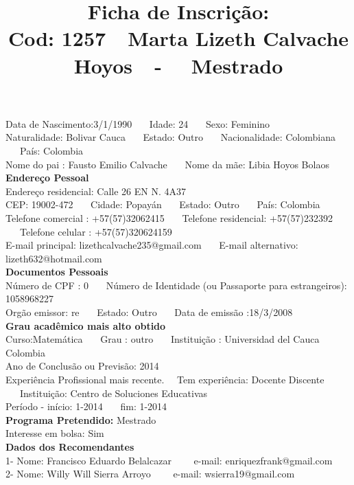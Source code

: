 \documentclass[11pt]{article}
\title{\vspace*{-4cm} Ficha de Inscrição: \\Cod: 1257\ \ Marta Lizeth Calvache Hoyos\ \ - \ \ Mestrado 
 }
\date{}
\begin{document}
\maketitle
\vspace*{-1.5cm}
\noindent Data de Nascimento:3/1/1990
\ \ \ Idade: 24   \ \ \ Sexo: Feminino
\\
Naturalidade: Bolivar Cauca  
\ \ \  Estado: Outro
\ \ \  Nacionalidade: Colombiana
\ \ \ País: Colombia
\\        
Nome do pai : Fausto Emilio Calvache 
\ \ \ Nome da mãe: Libia Hoyos Bolaos          
\\[0.2cm]                     
\textbf{Endereço Pessoal} 
\\ 
\noindent Endereço residencial: Calle 26 EN N. 4A37
\\
        CEP: 19002-472 
\ \ \ Cidade: Popayán 
\ \ \ Estado: Outro 
\ \ \ País: Colombia
\\		
		Telefone comercial : +57(57)32062415
\ \ \ Telefone residencial: +57(57)232392
\ \ \ Telefone celular : +57(57)320624159
\\
E-mail principal: lizethcalvache235@gmail.com
\ \ \ E-mail alternativo: lizeth632@hotmail.com 
\\[0.2cm] 
\textbf{Documentos Pessoais}
\\
\noindent Número de CPF : 0
\ \ \ Número de Identidade (ou Passaporte para estrangeiros): 1058968227
\\
Orgão emissor: re
\ \ \ Estado: Outro
\ \ \ Data de emissão :18/3/2008
\\[0.3cm]
\textbf{Grau acadêmico mais alto obtido}
\\	
Curso:Matemática
\ \ \ Grau : outro
\ \ \ Instituição : Universidad del Cauca  Colombia
\\			
Ano de Conclusão ou Previsão: 2014
\\ 
Experiência Profissional mais recente. \ \  
Tem experiência: Docente Discente  
\ \ \ Instituição: Centro de Soluciones Educativas
\\  
Período - início: 1-2014
\ \ \ fim: 1-2014
\\[0.2cm] 
\textbf{Programa Pretendido:} Mestrado\\
Interesse em bolsa: Sim
\\[0.3cm]		
\textbf{Dados dos Recomendantes} 
\\
1- Nome: Francisco Eduardo Belalcazar
\ \ \ \  e-mail: enriquezfrank@gmail.com 
\\
2- Nome: Willy Will Sierra Arroyo
\ \ \ \ e-mail: wsierra19@gmail.com
\end{document}
